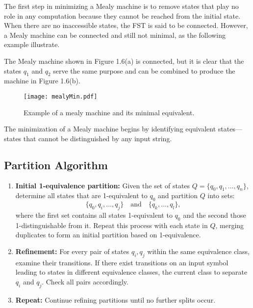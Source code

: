 The first step in minimizing a Mealy machine is to remove states that play no role in any computation 
because they cannot be reached from the initial state. When there are no inaccessible states, 
the FST is said to be connected. However, a Mealy machine can be connected and still not minimal, as the following example illustrate.

The Mealy machine shown in Figure 1.6(a) is connected, but it is clear that the states \( q_1 \) and \( q_2 \) 
serve the same purpose and can be combined to produce the machine in Figure 1.6(b).


\begin{figure}[htbp]
    \centering
    \texttt{[image: mealyMin.pdf]}
    \caption{Example of a mealy machine and its minimal equivalent.}
    \label{fig:6}
\end{figure}

The minimization of a Mealy machine begins by identifying equivalent states—states that cannot be distinguished by any input string.\cite{linz2011formal}

\subsection*{Partition Algorithm}

\begin{enumerate}
    \item \textbf{Initial 1-equivalence partition:}  
    Given the set of states \(Q = \{q_0, q_1, \ldots, q_n\}\), determine all states that are 1-equivalent to \(q_0\) and partition \(Q\) into sets:
    \[
    \{q_0, q_i, \ldots, q_j\} \quad \text{and} \quad \{q_k, \ldots, q_l\},
    \]
    where the first set contains all states 1-equivalent to \(q_0\) and the second those 1-distinguishable from it. 
    Repeat this process with each state in \(Q\), merging duplicates to form an initial partition based on 1-equivalence.
    
    \item \textbf{Refinement:}  
    For every pair of states \(q_i, q_j\) within the same equivalence class, examine their transitions. 
    If there exist transitions on an input symbol leading to states in different equivalence classes, 
    the current class to separate \(q_i\) and \(q_j\). Check all pairs accordingly.
    
    \item \textbf{Repeat:}  
    Continue refining partitions until no further splits occur.
\end{enumerate}

